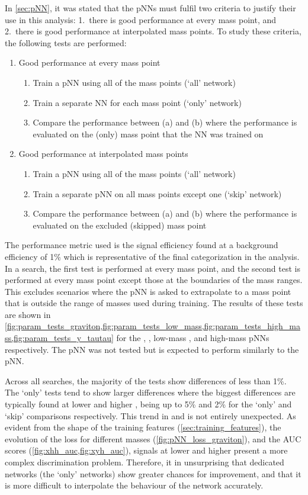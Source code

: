 \newpage
In \cref{sec:pNN}, it was stated that the pNNs must fulfil two criteria to justify their use in this analysis: 1.\ there is good performance at every mass point, and 2.\ there is good performance at interpolated mass points. To study these criteria, the following tests are performed:
\begin{enumerate}
    \item Good performance at every mass point
    \begin{enumerate}
        \item Train a pNN using all of the mass points (`all' network)
        \item Train a separate NN for each mass point (`only' network)
        \item Compare the performance between (a) and (b) where the performance is evaluated on the (only) mass point that the NN was trained on
    \end{enumerate}
    \item Good performance at interpolated mass points
    \begin{enumerate}
        \item Train a pNN using all of the mass points (`all' network)
        \item Train a separate pNN on all mass points except one (`skip' network) 
        \item Compare the performance between (a) and (b) where the performance is evaluated on the excluded (skipped) mass point
    \end{enumerate}
\end{enumerate}
The performance metric used is the signal efficiency found at a background efficiency of 1\% which is representative of the final categorization in the analysis. In a search, the first test is performed at every mass point, and the second test is performed at every mass point except those at the boundaries of the mass ranges. This excludes scenarios where the pNN is asked to extrapolate to a mass point that is outside the range of masses used during training. The results of these tests are shown in \cref{fig:param_tests_graviton,fig:param_tests_low_mass,fig:param_tests_high_mass,fig:param_tests_y_tautau} for the \XTwoHH, \XYttHgg, low-mass \XYggHtt, and high-mass \XYggHtt pNNs respectively. The \XZeroHH pNN was not tested but is expected to perform similarly to the \XTwoHH pNN.

Across all searches, the majority of the tests show differences of less than 1\%. The `only' tests tend to show larger differences where the biggest differences are typically found at lower \mX and higher \mY, being up to 5\% and 2\% for the `only' and `skip' comparisons respectively. This trend in \mX and \mY is not entirely unexpected. As evident from the shape of the training features (\cref{sec:training_features}), the evolution of the loss for different masses (\cref{fig:pNN_loss_graviton}), and the AUC scores (\cref{fig:xhh_auc,fig:xyh_auc}), signals at lower \mX and higher \mY present a more complex discrimination problem. Therefore, it in unsurprising that dedicated networks (the `only' networks) show greater chances for improvement, and that it is more difficult to interpolate the behaviour of the network accurately. 

